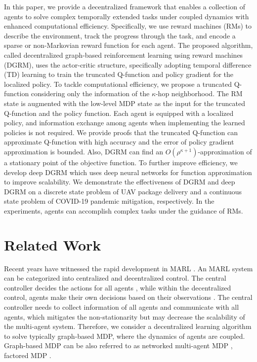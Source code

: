 \documentclass[conf]{new-aiaa}
\def\foo ABC{DGRM}
\begin{document}
In this paper, we provide a decentralized framework that enables a collection of agents to solve complex temporally extended tasks under coupled dynamics with enhanced computational efficiency. Specifically, we use reward machines (RMs) to describe the environment, track the progress through the task, and encode a sparse or non-Markovian reward function for each agent. The proposed algorithm, called decentralized graph-based reinforcement learning using reward machines (\foo ABC),  uses the actor-critic structure, specifically adopting temporal difference (TD) learning to train the truncated Q-function and policy gradient for the localized policy. To tackle computational efficiency, we propose a truncated Q-function considering only the information of the $\kappa$-hop neighborhood. The RM state is augmented with the low-level MDP state as the input for the truncated Q-function and the policy function. Each agent is equipped with a localized policy, and information exchange among agents when implementing the learned policies is not required. We provide proofs that the truncated Q-function can approximate Q-function with high accuracy and the error of policy gradient approximation is bounded. Also, \foo ABC can find an $O(\rho^{\kappa+1})$-approximation of a stationary point of the objective function. To further improve efficiency, we develop deep \foo ABC which uses deep neural networks for function approximation to improve scalability. We demonstrate the effectiveness of \foo ABC and deep \foo ABC on a discrete state problem of UAV package delivery and a continuous state problem of COVID-19 pandemic mitigation, respectively. In the experiments, agents can accomplish complex tasks under the guidance of RMs. 

\section{Related Work}

Recent years have witnessed the rapid development in MARL \cite{littman1994markov, claus1998dynamics, littman2001value, hu2003nash}. An MARL system can be categorized into centralized and decentralized control. The central controller decides the actions for all agents \cite{silver1990ils,hu2020uas}, while within the decentralized control, agents make their own decisions based on their observations \cite{hu2020uas,wang20213m}. The central controller needs to collect information of all agents and communicate with all agents, which mitigates the non-stationarity but may decrease the scalability of the multi-agent system. Therefore, we consider a decentralized learning algorithm to solve typically graph-based MDP, where the dynamics of agents are coupled. Graph-based MDP can be also referred to as networked multi-agent MDP \cite{zhang2018fully}, factored MDP \cite{guestrin2001multiagent,guestrin2003efficient,cubuktepe2021distributed}. 
\end{document}
